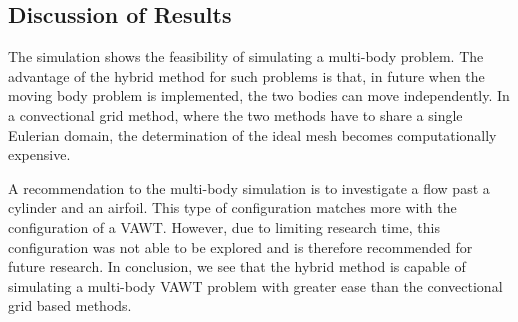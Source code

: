 \subsection{Discussion of Results}

The simulation shows the feasibility of simulating a multi-body problem. The advantage of the hybrid method for such problems is that, in future when the moving body problem is implemented, the two bodies can move independently. In a convectional grid method, where the two methods have to share a single Eulerian domain, the determination of the ideal mesh becomes computationally expensive.

A recommendation to the multi-body simulation is to investigate a flow past a cylinder and an airfoil. This type of configuration matches more with the configuration of a VAWT. However, due to limiting research time, this configuration was not able to be explored and is therefore recommended for future research. In conclusion, we see that the hybrid method is capable of simulating a multi-body VAWT problem with greater ease than the convectional grid based methods.








